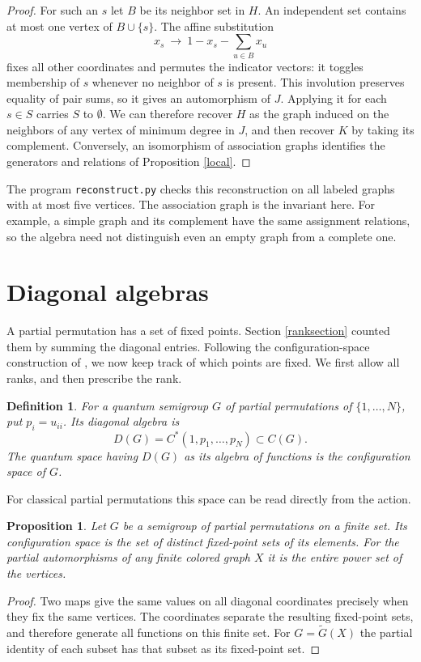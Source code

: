 \documentclass[11pt,a4paper]{article}
\newtheorem{prop}[thm]{Proposition}
\newtheorem{defn}[thm]{Definition}
\begin{document}
\begin{proof}
For such an $s$ let $B$ be its neighbor set in $H$. An independent set contains at most one vertex of $B\cup\{s\}$. The affine substitution
\[
 x_s\ \to\ 1-x_s-\sum_{u\in B}x_u
\]
fixes all other coordinates and permutes the indicator vectors: it toggles membership of $s$ whenever no neighbor of $s$ is present. This involution preserves equality of pair sums, so it gives an automorphism of $J$. Applying it for each $s\in S$ carries $S$ to $\emptyset$. We can therefore recover $H$ as the graph induced on the neighbors of any vertex of minimum degree in $J$, and then recover $K$ by taking its complement. Conversely, an isomorphism of association graphs identifies the generators and relations of Proposition \ref{local}.
\end{proof}

The program \texttt{reconstruct.py} checks this reconstruction on all labeled graphs with at most five vertices. The association graph is the invariant here. For example, a simple graph and its complement have the same assignment relations, so the algebra need not distinguish even an empty graph from a complete one.

\section{Diagonal algebras}\label{diagonalsection}

A partial permutation has a set of fixed points. Section \ref{ranksection} counted them by summing the diagonal entries. Following the configuration-space construction of \cite{qp}, we now keep track of which points are fixed. We first allow all ranks, and then prescribe the rank.

\begin{defn}\label{diagdef}
For a quantum semigroup $G$ of partial permutations of $\{1,\ldots,N\}$, put $p_i=u_{ii}$. Its diagonal algebra is
\[
 D(G)=C^*(1,p_1,\ldots,p_N)\subset C(G).
\]
The quantum space having $D(G)$ as its algebra of functions is the configuration space of $G$.
\end{defn}

For classical partial permutations this space can be read directly from the action.

\begin{prop}\label{fixed}
Let $G$ be a semigroup of partial permutations on a finite set. Its configuration space is the set of distinct fixed-point sets of its elements. For the partial automorphisms of any finite colored graph $X$ it is the entire power set of the vertices.
\end{prop}
\begin{proof}
Two maps give the same values on all diagonal coordinates precisely when they fix the same vertices. The coordinates separate the resulting fixed-point sets, and therefore generate all functions on this finite set. For $G=\widetilde G(X)$ the partial identity of each subset has that subset as its fixed-point set.
\end{proof}
\end{document}
